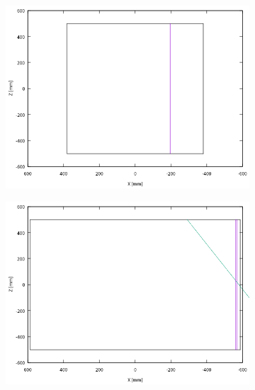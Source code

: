 \documentclass[bachelor,openany,oneside,color]{buaathesis}
\begin{document}
\begin{figure}
	\centering
	\begin{subfigure}[c]{0.3\linewidth}
		\includegraphics[width=\textwidth]{./resource/MWDC1-result.png}
		\label{fig:result:MWDC1}
	\end{subfigure}
	\begin{subfigure}[c]{0.3\linewidth}
		\includegraphics[width=\textwidth]{./resource/MWDC2-result.png}
		\label{fig:result:MWDC2}
	\end{subfigure}
	\begin{subfigure}[c]{0.3\linewidth}

\end{subfigure}
\end{figure}
\end{document}
